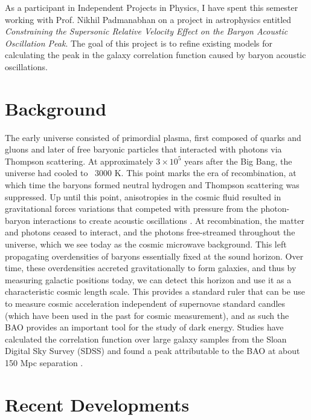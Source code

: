 \documentclass[12pt]{article}
\begin{document}
\maketitle


As a participant in Independent Projects in Physics, I have spent this semester working with Prof. Nikhil Padmanabhan on a project in astrophysics entitled \emph{Constraining the Supersonic Relative Velocity Effect on the Baryon Acoustic Oscillation Peak}. The goal of this project is to refine existing models for calculating the peak in the galaxy correlation function caused by baryon acoustic oscillations.

\section{Background}

The early universe consisted of primordial plasma, first composed of quarks and gluons and later of free baryonic particles that interacted with photons via Thompson scattering. At approximately $3\times10^{5}$ years after the Big Bang, the universe had cooled to ~3000 K. This point marks the era of recombination, at which time the baryons formed neutral hydrogen and Thompson scattering was suppressed. Up until this point, anisotropies in the cosmic fluid resulted in gravitational forces variations that competed with pressure from the photon-baryon interactions to create acoustic oscillations \cite{Eisenstein}. At recombination, the matter and photons ceased to interact, and the photons free-streamed throughout the universe, which we see today as the cosmic microwave background. This left propagating overdensities of baryons essentially fixed at the sound horizon. Over time, these overdensities accreted gravitationally to form galaxies, and thus by measuring galactic positions today, we can detect this horizon and use it as a characteristic cosmic length scale. This provides a standard ruler that can be use to measure cosmic acceleration independent of supernovae standard candles (which have been used in the past for cosmic measurement), and as such the BAO provides an important tool for the study of dark energy. Studies have calculated the correlation function over large galaxy samples from the Sloan Digital Sky Survey (SDSS) and found a peak attributable to the BAO at about 150 Mpc separation \cite{Eisensteinetal}.

\section{Recent Developments}
\end{document}
